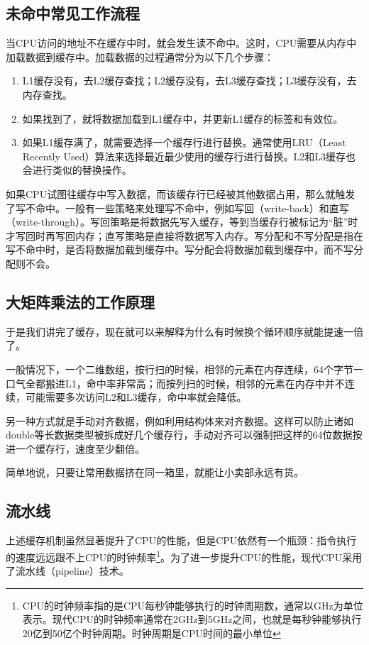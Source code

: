 \subsection{未命中常见工作流程}

当CPU访问的地址不在缓存中时，就会发生读不命中。这时，CPU需要从内存中加载数据到缓存中。加载数据的过程通常分为以下几个步骤：
\begin{enumerate}
  \item L1缓存没有，去L2缓存查找；L2缓存没有，去L3缓存查找；L3缓存没有，去内存查找。
  \item 如果找到了，就将数据加载到L1缓存中，并更新L1缓存的标签和有效位。
  \item 如果L1缓存满了，就需要选择一个缓存行进行替换。通常使用LRU（Least Recently Used）算法来选择最近最少使用的缓存行进行替换。L2和L3缓存也会进行类似的替换操作。
\end{enumerate}

如果CPU试图往缓存中写入数据，而该缓存行已经被其他数据占用，那么就触发了写不命中。一般有一些策略来处理写不命中，例如写回（write-back）和直写（write-through）。写回策略是将数据先写入缓存，等到当缓存行被标记为“脏”时才写回时再写回内存；直写策略是直接将数据写入内存。写分配和不写分配是指在写不命中时，是否将数据加载到缓存中。写分配会将数据加载到缓存中，而不写分配则不会。

\subsection{大矩阵乘法的工作原理}

于是我们讲完了缓存，现在就可以来解释为什么有时候换个循环顺序就能提速一倍了。

一般情况下，一个二维数组，按行扫的时候，相邻的元素在内存连续，64个字节一口气全都搬进L1，命中率非常高；而按列扫的时候，相邻的元素在内存中并不连续，可能需要多次访问L2和L3缓存，命中率就会降低。

另一种方式就是手动对齐数据，例如利用结构体来对齐数据。这样可以防止诸如double等长数据类型被拆成好几个缓存行，手动对齐可以强制把这样的64位数据按进一个缓存行，速度至少翻倍。

简单地说，只要让常用数据挤在同一箱里，就能让小卖部永远有货。

\subsection{流水线}

上述缓存机制虽然显著提升了CPU的性能，但是CPU依然有一个瓶颈：指令执行的速度远远跟不上CPU的时钟频率\footnote{CPU的时钟频率指的是CPU每秒钟能够执行的时钟周期数，通常以GHz为单位表示。现代CPU的时钟频率通常在2GHz到5GHz之间，也就是每秒钟能够执行20亿到50亿个时钟周期。时钟周期是CPU时间的最小单位}。为了进一步提升CPU的性能，现代CPU采用了流水线（pipeline）技术。

